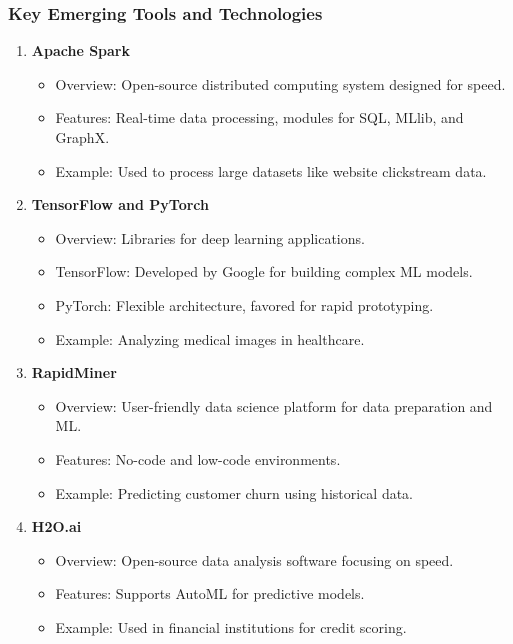 \documentclass{beamer}
\begin{document}
\begin{frame}
    \frametitle{Key Emerging Tools and Technologies}
    \begin{enumerate}
        \item \textbf{Apache Spark} 
        \begin{itemize}
            \item Overview: Open-source distributed computing system designed for speed.
            \item Features: Real-time data processing, modules for SQL, MLlib, and GraphX.
            \item Example: Used to process large datasets like website clickstream data.
        \end{itemize}
        
        \item \textbf{TensorFlow and PyTorch}
        \begin{itemize}
            \item Overview: Libraries for deep learning applications.
            \item TensorFlow: Developed by Google for building complex ML models.
            \item PyTorch: Flexible architecture, favored for rapid prototyping.
            \item Example: Analyzing medical images in healthcare.
        \end{itemize}
        
        \item \textbf{RapidMiner}
        \begin{itemize}
            \item Overview: User-friendly data science platform for data preparation and ML.
            \item Features: No-code and low-code environments.
            \item Example: Predicting customer churn using historical data.
        \end{itemize}
        
        \item \textbf{H2O.ai}
        \begin{itemize}
            \item Overview: Open-source data analysis software focusing on speed.
            \item Features: Supports AutoML for predictive models.
            \item Example: Used in financial institutions for credit scoring.
        \end{itemize}
        

\end{enumerate}
\end{frame}
\end{document}
